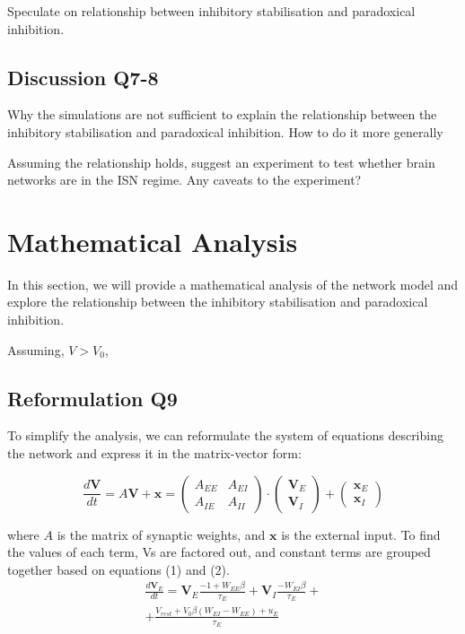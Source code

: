 \documentclass[10pt,twocolumn]{article}
\begin{document}
Speculate on relationship between inhibitory stabilisation
and paradoxical inhibition.

\subsection{Discussion Q7-8}
Why the simulations are not sufficient to explain
the relationship between the inhibitory stabilisation
and paradoxical inhibition. How to do it more generally

Assuming the relationship holds, suggest an experiment
to test whether brain networks are in the ISN regime.
Any caveats to the experiment?

\section{Mathematical Analysis}
In this section, we will provide a mathematical analysis
of the network model and explore the relationship between
the inhibitory stabilisation and paradoxical inhibition.

Assuming, $V > V_0$,

\subsection{Reformulation Q9}
To simplify the analysis, we can reformulate the system
of equations describing the network and
express it in the matrix-vector form:

$$
    \frac{d\textbf{V}}{dt}
    = A\textbf{V} + \textbf{x}
    =
    \begin{pmatrix}
        A_{EE} & A_{EI} \\
        A_{IE} & A_{II}
    \end{pmatrix}
    \cdot \begin{pmatrix} \textbf{V}_E \\ \textbf{V}_I \end{pmatrix}
    + \begin{pmatrix} \textbf{x}_E \\ \textbf{x}_I \end{pmatrix}
$$

where $A$ is the matrix of synaptic weights,
and $\textbf{x}$ is the external input.
To find the values of each term, Vs are factored out, and
constant terms are grouped together based on equations (1) and (2).
$$
    \begin{align*}
        \frac{d\textbf{V}_E}{dt}
        = \textbf{V}_E \boxed{\frac{-1 + W_{EE}\beta}{\tau_E}}
        + \textbf{V}_I \boxed{\frac{-W_{EI}\beta}{\tau_E}}+
        \\
        + \boxed{\frac{V_{rest} + V_0\beta(W_{EI}-W_{EE}) + u_E}{\tau_E}}
    \end{align*}
$$
\end{document}
